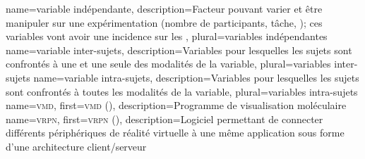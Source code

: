 %
{%
	name={variable indépendante},%
	description={Facteur pouvant varier et être manipuler sur une expérimentation (nombre de participants, tâche, \myetc); ces variables vont avoir une incidence sur les },%
	plural={variables indépendantes}%
}
%
{%
	name={variable inter-sujets},%
	description={Variables pour lesquelles les sujets sont confrontés à une et une seule des modalités de la variable},%
	plural={variables inter-sujets}%
}
%
{%
	name={variable intra-sujets},%
	description={Variables pour lesquelles les sujets sont confrontés à toutes les modalités de la variable},%
	plural={variables intra-sujets}%
}
%
{%
	name={\textsc{vmd}},%
	first={\textsc{vmd} ()},%
	description={Programme de visualisation moléculaire }%
}
%
{%
	name={\textsc{vrpn}},%
	first={\textsc{vrpn} ()},%
	description={Logiciel permettant de connecter différents périphériques de réalité virtuelle à une même application sous forme d'une architecture client/serveur }%
}

